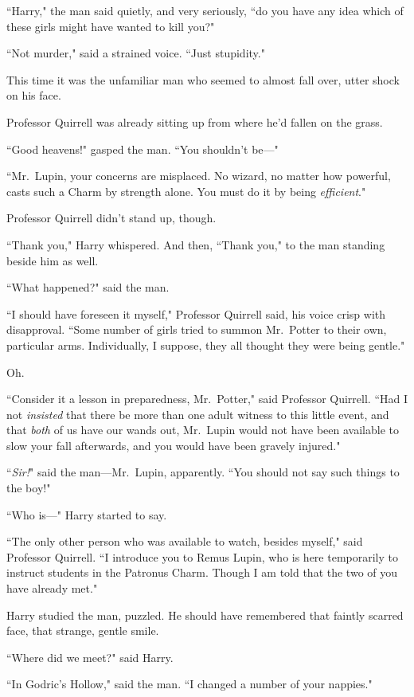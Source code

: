``Harry," the man said quietly, and very seriously, ``do you have any idea which of these girls might have wanted to kill you?"

``Not murder," said a strained voice. ``Just stupidity."

This time it was the unfamiliar man who seemed to almost fall over, utter shock on his face.

Professor Quirrell was already sitting up from where he'd fallen on the grass.

``Good heavens!" gasped the man. ``You shouldn't be---"

``Mr.~Lupin, your concerns are misplaced. No wizard, no matter how powerful, casts such a Charm by strength alone. You must do it by being \emph{efficient}."

Professor Quirrell didn't stand up, though.

``Thank you," Harry whispered. And then, ``Thank you," to the man standing beside him as well.

``What happened?" said the man.

``I should have foreseen it myself," Professor Quirrell said, his voice crisp with disapproval. ``Some number of girls tried to summon Mr.~Potter to their own, particular arms. Individually, I suppose, they all thought they were being gentle."

Oh.

``Consider it a lesson in preparedness, Mr.~Potter," said Professor Quirrell. ``Had I not \emph{insisted} that there be more than one adult witness to this little event, and that \emph{both} of us have our wands out, Mr.~Lupin would not have been available to slow your fall afterwards, and you would have been gravely injured."

``\emph{Sir!}" said the man---Mr.~Lupin, apparently. ``You should not say such things to the boy!"

``Who is---" Harry started to say.

``The only other person who was available to watch, besides myself," said Professor Quirrell. ``I introduce you to Remus Lupin, who is here temporarily to instruct students in the Patronus Charm. Though I am told that the two of you have already met."

Harry studied the man, puzzled. He should have remembered that faintly scarred face, that strange, gentle smile.

``Where did we meet?" said Harry.

``In Godric's Hollow," said the man. ``I changed a number of your nappies."

